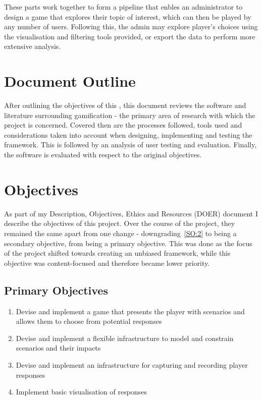 These parts work together to form a pipeline that enbles an administrator to design a game that explores their topic of interest, which can then be played by any number of users. Following this, the admin may explore player's choices using the visualisation and filtering tools provided, or export the data to perform more extensive analysis.  

\section{Document Outline}
After outlining the objectives of this \od{}, this document reviews the software and literature surrounding gamification - the primary area of research with which the project is concerned.
Covered then are the processes followed, tools used and considerations taken into account when designing, implementing and testing the framework. 
This is followed by an analysis of user testing and evaluation.
Finally, the software is evaluated with respect to the original objectives.

\section{Objectives}
As part of my Description, Objectives, Ethics and Resources (DOER) document I describe the objectives of this project. Over the course of the project, they remained the same apart from one change - downgrading~\ref{SO:2} to being a secondary objective, from being a primary objective. This was done as the focus of the project shifted towards creating an unbiased framework, while this objective was content-focused and therefore became lower priority.

\subsection{Primary Objectives}
\begin{enumerate}[label=\textbf{PO.\arabic*}]
    \item Devise and implement a game that presents the player with scenarios and allows them to choose from potential responses
    \item Devise and implement a flexible infrastructure to model and constrain scenarios and their impacts
    \item Devise and implement an infrastructure for capturing and recording player responses
    \item Implement basic visualisation of responses
\end{enumerate}
